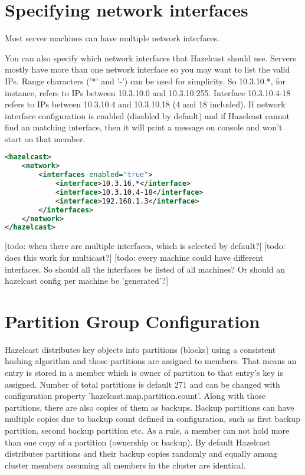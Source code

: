 \section{Specifying network interfaces}
Most server machines can have multiple network interfaces. 

You can also specify which network interfaces that Hazelcast should use. Servers mostly have more than one network interface so you may want to list the valid IPs. Range characters ('*' and '-') can be used for simplicity. So 10.3.10.*, for instance, refers to IPs between 10.3.10.0 and 10.3.10.255. Interface 10.3.10.4-18 refers to IPs between 10.3.10.4 and 10.3.10.18 (4 and 18 included). If network interface configuration is enabled (disabled by default) and if Hazelcast cannot find an matching interface, then it will print a message on console and won't start on that member.

\begin{lstlisting}[language=xml]
<hazelcast>
    <network>
        <interfaces enabled="true">
            <interface>10.3.16.*</interface> 
            <interface>10.3.10.4-18</interface> 
            <interface>192.168.1.3</interface>         
        </interfaces>    
    </network>
</hazelcast>
\end{lstlisting}

[todo: when there are multiple interfaces, which is selected by default?]
[todo: does this work for multicast?]
[todo: every machine could have different interfaces. So should all the interfaces be listed of all machines? Or should an hazelcast config per machine be 'generated'?]

\section{Partition Group Configuration}
Hazelcast distributes key objects into partitions (blocks) using a consistent hashing algorithm and those partitions are assigned to members. That means an entry is stored in a member which is owner of partition to that entry's key is assigned. Number of total partitions is default 271 and can be changed with configuration property 'hazelcast.map.partition.count'. Along with those partitions, there are also copies of them as backups. Backup partitions can have multiple copies due to backup count defined in configuration, such as first backup partition, second backup partition etc. As a rule, a member can not hold more than one copy of a partition (ownership or backup). By default Hazelcast distributes partitions and their backup copies randomly and equally among cluster members assuming all members in the cluster are identical.


